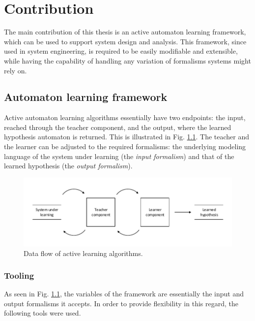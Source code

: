 \chapter{Contribution}

The main contribution of this thesis is an active automaton learning framework, which can be used to support system design and analysis. This framework, since used in system engineering, is required to be easily modifiable and extensible, while having the capability of handling any variation of formalisms systems might rely on.


\section{Automaton learning framework}

Active automaton learning algorithms essentially have two endpoints: the input, reached through the teacher component, and the output, where the learned hypothesis automaton is returned. This is illustrated in Fig. \ref{fig:learningcomm}. The teacher and the learner can be adjusted to the required formalisms: the underlying modeling language of the system under learning (the \emph{input formalism}) and that of the learned hypothesis (the \emph{output formalism}). \\
\begin{figure}[H]
	\centering
	\includegraphics[width=1.0\linewidth]{figures/learningcomm}
	\caption{Data flow of active learning algorithms.}
	\label{fig:learningcomm}
\end{figure}

\subsection{Tooling}

As seen in Fig. \ref{fig:learningcomm}, the variables of the framework are essentially the input and output formalisms it accepts. In order to provide flexibility in this regard, the following tools were used.

